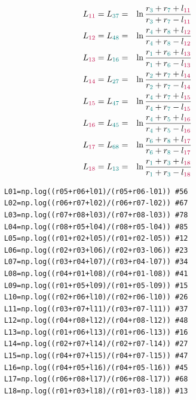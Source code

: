 \begin{enumerate}
\begin{eqnarray}
L_{\color{purple}11} = L_{\color{teal}37} 
&=& \ln \frac{r_{\color{teal}3}+r_{\color{teal}7}+l_{\color{purple}11}}
             {r_{\color{teal}3}+r_{\color{teal}7}-l_{\color{purple}11}} 
\nonumber\\
L_{\color{purple}12} = L_{\color{teal}48} 
&=& \ln \frac{r_{\color{teal}4}+r_{\color{teal}8}+l_{\color{purple}12}}
             {r_{\color{teal}4}+r_{\color{teal}8}-l_{\color{purple}12}} 
\nonumber\\
L_{\color{purple}13} = L_{\color{teal}16} 
&=& \ln \frac{r_{\color{teal}1}+r_{\color{teal}6}+l_{\color{purple}13}}
             {r_{\color{teal}1}+r_{\color{teal}6}-l_{\color{purple}13}} 
\nonumber\\
L_{\color{purple}14} = L_{\color{teal}27} 
&=& \ln \frac{r_{\color{teal}2}+r_{\color{teal}7}+l_{\color{purple}14}}
             {r_{\color{teal}2}+r_{\color{teal}7}-l_{\color{purple}14}} 
\nonumber\\
L_{\color{purple}15} = L_{\color{teal}47} 
&=& \ln \frac{r_{\color{teal}4}+r_{\color{teal}7}+l_{\color{purple}15}}
             {r_{\color{teal}4}+r_{\color{teal}7}-l_{\color{purple}15}} 
\nonumber\\
L_{\color{purple}16} = L_{\color{teal}45} 
&=& \ln \frac{r_{\color{teal}4}+r_{\color{teal}5}+l_{\color{purple}16}}
             {r_{\color{teal}4}+r_{\color{teal}5}-l_{\color{purple}16}} 
\nonumber\\
L_{\color{purple}17} = L_{\color{teal}68} 
&=& \ln \frac{r_{\color{teal}6}+r_{\color{teal}8}+l_{\color{purple}17}}
             {r_{\color{teal}6}+r_{\color{teal}8}-l_{\color{purple}17}} 
\nonumber\\
L_{\color{purple}18} = L_{\color{teal}13} 
&=& \ln \frac{r_{\color{teal}1}+r_{\color{teal}3}+l_{\color{purple}18}}
             {r_{\color{teal}1}+r_{\color{teal}3}-l_{\color{purple}18}} 
\nonumber
\end{eqnarray}

{\tiny
\begin{lstlisting}
    L01=np.log((r05+r06+l01)/(r05+r06-l01)) #56 
    L02=np.log((r06+r07+l02)/(r06+r07-l02)) #67 
    L03=np.log((r07+r08+l03)/(r07+r08-l03)) #78 
    L04=np.log((r08+r05+l04)/(r08+r05-l04)) #85 
    L05=np.log((r01+r02+l05)/(r01+r02-l05)) #12 
    L06=np.log((r02+r03+l06)/(r02+r03-l06)) #23 
    L07=np.log((r03+r04+l07)/(r03+r04-l07)) #34 
    L08=np.log((r04+r01+l08)/(r04+r01-l08)) #41 
    L09=np.log((r01+r05+l09)/(r01+r05-l09)) #15 
    L10=np.log((r02+r06+l10)/(r02+r06-l10)) #26 
    L11=np.log((r03+r07+l11)/(r03+r07-l11)) #37 
    L12=np.log((r04+r08+l12)/(r04+r08-l12)) #48 
    L13=np.log((r01+r06+l13)/(r01+r06-l13)) #16 
    L14=np.log((r02+r07+l14)/(r02+r07-l14)) #27 
    L15=np.log((r04+r07+l15)/(r04+r07-l15)) #47 
    L16=np.log((r04+r05+l16)/(r04+r05-l16)) #45 
    L17=np.log((r06+r08+l17)/(r06+r08-l17)) #68 
    L18=np.log((r01+r03+l18)/(r01+r03-l18)) #13 
\end{lstlisting}
}



\end{enumerate}
